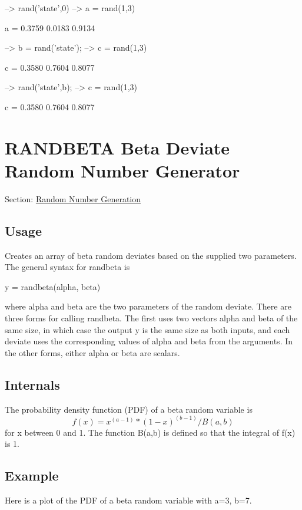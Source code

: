 \begin{DoxyVerbInclude}
--> rand('state',0)    %
--> a = rand(1,3)      %

a = 
    0.3759    0.0183    0.9134 

--> b = rand('state'); %
--> c = rand(1,3)      %

c = 
    0.3580    0.7604    0.8077 

--> rand('state',b);   %
--> c = rand(1,3)      %

c = 
    0.3580    0.7604    0.8077 
\end{DoxyVerbInclude}
 \hypertarget{random_randbeta}{}\section{R\-A\-N\-D\-B\-E\-T\-A Beta Deviate Random Number Generator}\label{random_randbeta}
Section\-: \hyperlink{sec_random}{Random Number Generation} \hypertarget{vtkwidgets_vtkxyplotwidget_Usage}{}\subsection{Usage}\label{vtkwidgets_vtkxyplotwidget_Usage}
Creates an array of beta random deviates based on the supplied two parameters. The general syntax for {\ttfamily randbeta} is \begin{DoxyVerb}   y = randbeta(alpha, beta)
\end{DoxyVerb}
 where {\ttfamily alpha} and {\ttfamily beta} are the two parameters of the random deviate. There are three forms for calling {\ttfamily randbeta}. The first uses two vectors {\ttfamily alpha} and {\ttfamily beta} of the same size, in which case the output {\ttfamily y} is the same size as both inputs, and each deviate uses the corresponding values of {\ttfamily alpha} and {\ttfamily beta} from the arguments. In the other forms, either {\ttfamily alpha} or {\ttfamily beta} are scalars. \hypertarget{transforms_svd_Function}{}\subsection{Internals}\label{transforms_svd_Function}
The probability density function (P\-D\-F) of a beta random variable is \[ f(x) = x^(a-1) * (1-x)^(b-1) / B(a,b) \] for {\ttfamily x} between 0 and 1. The function {\ttfamily B(a,b)} is defined so that the integral of {\ttfamily f(x)} is 1. \hypertarget{variables_struct_Example}{}\subsection{Example}\label{variables_struct_Example}
Here is a plot of the P\-D\-F of a beta random variable with {\ttfamily a=3}, {\ttfamily b=7}.


